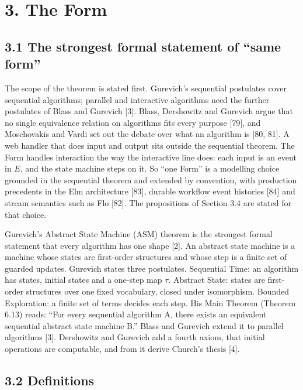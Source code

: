 \documentclass[10pt,letterpaper]{article}
\begin{document}
\section{3. The Form}\label{the-form}

\subsection{3.1 The strongest formal statement of ``same
form''}\label{the-strongest-formal-statement-of-same-form}

The scope of the theorem is stated first. Gurevich's sequential
postulates cover sequential algorithms; parallel and interactive
algorithms need the further postulates of Blass and Gurevich {[}3{]}.
Blass, Dershowitz and Gurevich argue that no single equivalence relation
on algorithms fits every purpose {[}79{]}, and Moschovakis and Vardi set
out the debate over what an algorithm is {[}80, 81{]}. A web handler
that does input and output sits outside the sequential theorem. The Form
handles interaction the way the interactive line does: each input is an
event in \(E\), and the state machine steps on it. So ``one Form'' is a
modelling choice grounded in the sequential theorem and extended by
convention, with production precedents in the Elm architecture {[}83{]},
durable workflow event histories {[}84{]} and stream semantics such as
Flo {[}82{]}. The propositions of Section 3.4 are stated for that
choice.

Gurevich's Abstract State Machine (ASM) theorem is the strongest formal
statement that every algorithm has one shape {[}2{]}. An abstract state
machine is a machine whose states are first-order structures and whose
step is a finite set of guarded updates. Gurevich states three
postulates. Sequential Time: an algorithm has states, initial states and
a one-step map \(\tau\). Abstract State: states are first-order
structures over one fixed vocabulary, closed under isomorphism. Bounded
Exploration: a finite set of terms decides each step. His Main Theorem
(Theorem 6.13) reads: ``For every sequential algorithm A, there exists
an equivalent sequential abstract state machine B.'' Blass and Gurevich
extend it to parallel algorithms {[}3{]}. Dershowitz and Gurevich add a
fourth axiom, that initial operations are computable, and from it derive
Church's thesis {[}4{]}.

\subsection{3.2 Definitions}\label{definitions}
\end{document}

